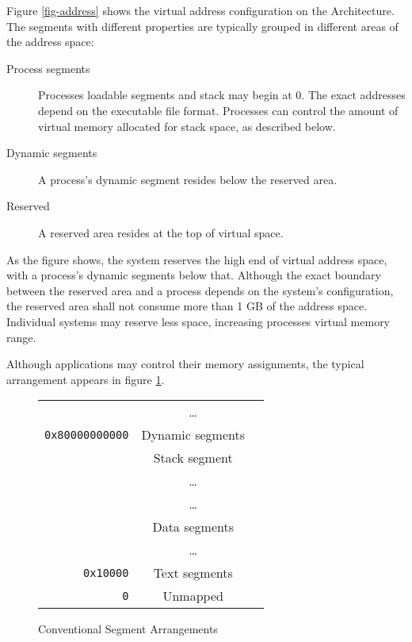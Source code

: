 Figure \ref{fig-address} shows the virtual address configuration on the \xARCH
Architecture.  The segments with different properties are typically grouped in
different areas of the address space:

\begin{description}
  \item [Process segments]
    Processes loadable segments and stack may begin at 0. The exact addresses
    depend on the executable file format. Processes can control the amount
    of virtual memory allocated for stack space, as described below.
  \item [Dynamic segments]
    A process's dynamic segment resides below the reserved area.
  \item [Reserved] A reserved area resides at the top of virtual space.
\end{description}

As the figure shows, the system reserves the high end of virtual address space,
with a process's dynamic segments below that. Although the exact boundary
between the reserved area and a process depends on the system's configuration,
the reserved area shall not consume more than 1 GB of the address space.
Individual systems may reserve less space, increasing processes  virtual memory
range.

Although applications may control their memory assignments, the typical
arrangement appears in figure \ref{fig-cfg}.

\begin{figure}[H]
  \caption{Conventional Segment Arrangements}
  \label{fig-cfg}
  \begin{center}
    \begin{tabular}{r|c|l}
      \cline{2-2}
      & \dots & \\
      \verb|0x80000000000| & Dynamic segments & \\ \cline{2-2}
      & Stack segment & \\ 
      & \dots & \\ \cline{2-2}
      & \dots & \\
      & Data segments & \\ \cline{2-2}
      & \dots & \\
      \verb|0x10000| & Text segments & \\ \cline{2-2}
      \verb|0| & Unmapped & \\ \cline{2-2}
    \end{tabular}
  \end{center}
\end{figure}


